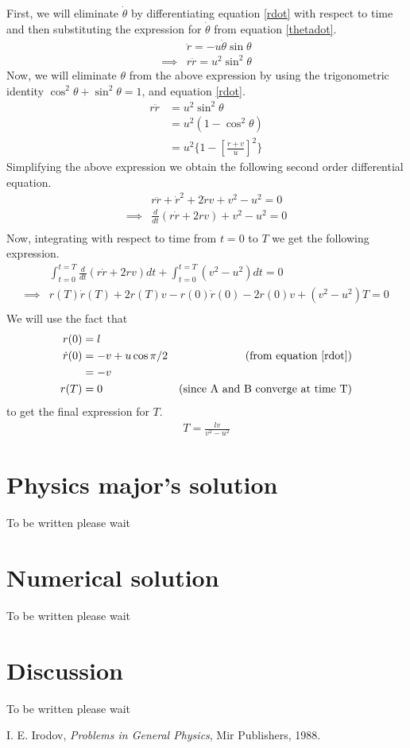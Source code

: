 \documentclass{article}
\begin{document}
First,
we will eliminate $\dot{\theta}$
by differentiating equation \ref{rdot}
with respect to time
and then substituting the expression for $\dot{\theta}$
from equation \ref{thetadot}.
\begin{align*}
	& \ddot{r} = - u \dot{\theta} \sin \theta \\
	\implies & r \ddot{r} = u^2 \sin^2 \theta
\end{align*}
Now, we will eliminate $\theta$ from the above expression
by using the trigonometric identity
$\cos^2 \theta + \sin^2 \theta = 1$,
and equation \ref{rdot}.
\begin{align*}
	r \ddot{r} &= u^2 \sin^2 \theta \\
	&= u^2 (1 - \cos^2 \theta) \\
	&= u^2 \{1 - \left[\frac{\dot{r}+v}{u}\right]^2 \}
\end{align*}
Simplifying the above expression
we obtain the following second order differential equation.
\begin{align*}
	& r\ddot{r} + \dot{r}^2 + 2\dot{r}v + v^2 - u^2 = 0 \\
	\implies & \frac{d}{dt}(r\dot{r} + 2rv) + v^2 - u^2 = 0 \\
\end{align*}
Now, integrating with respect to time from $t = 0$ to $T$
we get the following expression.
\begin{align*}
	& \int_{t=0}^{t=T} \frac{d}{dt}(r\dot{r} + 2rv) dt
	+ \int_{t=0}^{t=T} (v^2 - u^2) dt = 0 \\
	\implies & r(T)\dot{r}(T) + 2r(T)v - r(0)\dot{r}(0) - 2r(0)v
	+ (v^2 - u^2)T = 0 \\
\end{align*}
We will use the fact that
\begin{align*}
	r(0) &= l \\
	\dot{r}(0) &= -v + u \cos \pi/2  & \mbox{(from equation \ref{rdot})}\\
	&= -v \\
	r(T) &= 0 & \mbox{(since A and B converge at time T)}
\end{align*}
to get the final expression for $T$.
\begin{align}
	T = \frac{lv}{v^2 - u^2}
\end{align}

\section{Physics major's solution}
To be written please wait

\section{Numerical solution}
To be written please wait

\section*{Discussion}
To be written please wait

\begin{thebibliography}{9}
 I. E. Irodov, \textit{Problems in General Physics}, Mir Publishers, 1988.
\end{thebibliography}
\end{document}
